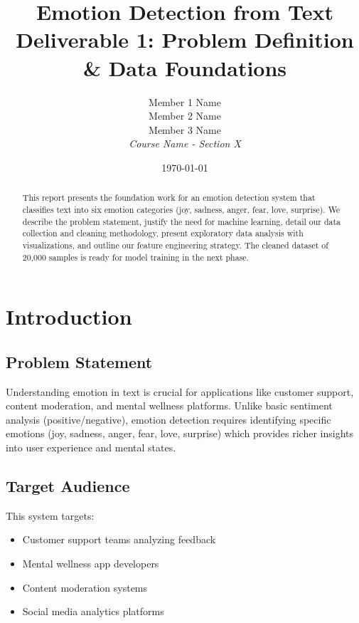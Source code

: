 \documentclass[12pt,a4paper]{article}
\title{\textbf{Emotion Detection from Text}\\
\large Deliverable 1: Problem Definition \& Data Foundations}
\author{
Member 1 Name \\
Member 2 Name \\
Member 3 Name \\
\textit{Course Name - Section X}
}
\date{\today}
\begin{document}
\maketitle

\begin{abstract}
This report presents the foundation work for an emotion detection system that classifies text into six emotion categories (joy, sadness, anger, fear, love, surprise). We describe the problem statement, justify the need for machine learning, detail our data collection and cleaning methodology, present exploratory data analysis with visualizations, and outline our feature engineering strategy. The cleaned dataset of 20,000 samples is ready for model training in the next phase.
\end{abstract}

\tableofcontents
\newpage

\section{Introduction}

\subsection{Problem Statement}
Understanding emotion in text is crucial for applications like customer support, content moderation, and mental wellness platforms. Unlike basic sentiment analysis (positive/negative), emotion detection requires identifying specific emotions (joy, sadness, anger, fear, love, surprise) which provides richer insights into user experience and mental states.

\subsection{Target Audience}
This system targets:
\begin{itemize}
    \item Customer support teams analyzing feedback
    \item Mental wellness app developers
    \item Content moderation systems
    \item Social media analytics platforms
\end{itemize}
\end{document}
